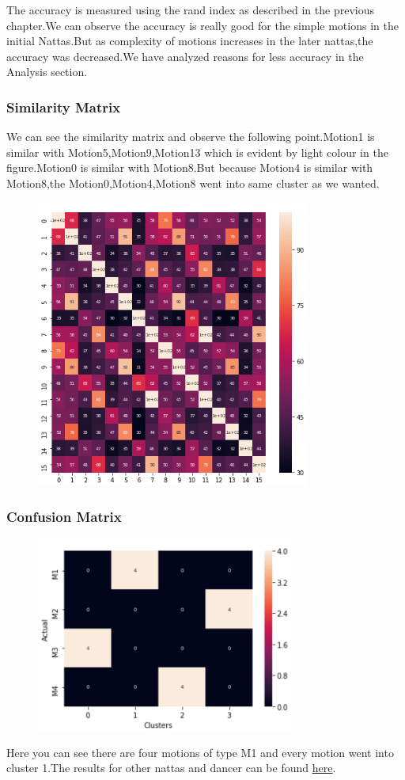 The accuracy is measured using the rand index as described in the previous chapter.We can observe the accuracy is really good for the simple motions in the initial Nattas.But as complexity of motions increases in the later nattas,the accuracy was decreased.We have analyzed reasons for less accuracy in the Analysis section.

\subsubsection{Similarity Matrix}
We can see the similarity matrix and observe the following point.Motion1 is similar with Motion5,Motion9,Motion13 which is evident by light colour in the figure.Motion0 is similar with Motion8.But because Motion4 is similar with Motion8,the Motion0,Motion4,Motion8 went into same cluster as we wanted.
\begin{figure} [H]
\centering
\includegraphics[width=90mm]{Pictures/sim.png}
\end{figure}
\subsubsection{Confusion Matrix}

\begin{figure} [H]
\centering
\includegraphics[width=85mm]{Pictures/confuse.png}
\end{figure}
Here you can see there are four motions of type M1 and every motion went into cluster 1.The results for other nattas and dancer can be found \href{https://docs.google.com/document/d/1tpQId7VadBUHFW8xKCehUH4VTjIplCjThj6Vl_HT_N4/edit}{here}.


